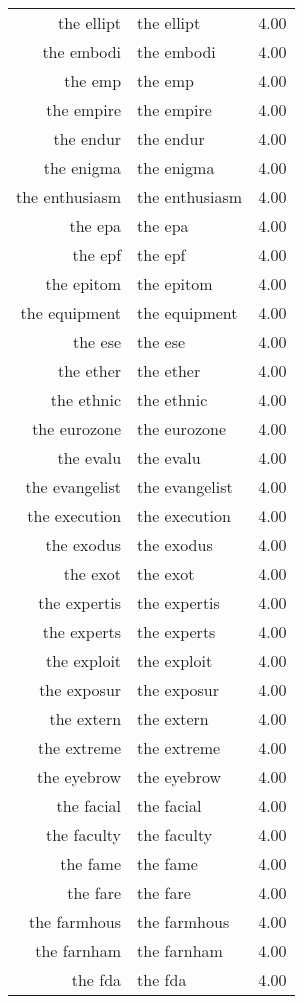 \begin{table}[ht]
\begin{tabular}{rlr}
  the ellipt & the ellipt & 4.00 \\ 
  the embodi & the embodi & 4.00 \\ 
  the emp & the emp & 4.00 \\ 
  the empire & the empire & 4.00 \\ 
  the endur & the endur & 4.00 \\ 
  the enigma & the enigma & 4.00 \\ 
  the enthusiasm & the enthusiasm & 4.00 \\ 
  the epa & the epa & 4.00 \\ 
  the epf & the epf & 4.00 \\ 
  the epitom & the epitom & 4.00 \\ 
  the equipment & the equipment & 4.00 \\ 
  the ese & the ese & 4.00 \\ 
  the ether & the ether & 4.00 \\ 
  the ethnic & the ethnic & 4.00 \\ 
  the eurozone & the eurozone & 4.00 \\ 
  the evalu & the evalu & 4.00 \\ 
  the evangelist & the evangelist & 4.00 \\ 
  the execution & the execution & 4.00 \\ 
  the exodus & the exodus & 4.00 \\ 
  the exot & the exot & 4.00 \\ 
  the expertis & the expertis & 4.00 \\ 
  the experts & the experts & 4.00 \\ 
  the exploit & the exploit & 4.00 \\ 
  the exposur & the exposur & 4.00 \\ 
  the extern & the extern & 4.00 \\ 
  the extreme & the extreme & 4.00 \\ 
  the eyebrow & the eyebrow & 4.00 \\ 
  the facial & the facial & 4.00 \\ 
  the faculty & the faculty & 4.00 \\ 
  the fame & the fame & 4.00 \\ 
  the fare & the fare & 4.00 \\ 
  the farmhous & the farmhous & 4.00 \\ 
  the farnham & the farnham & 4.00 \\ 
  the fda & the fda & 4.00 \\ 

\end{tabular}
\end{table}
